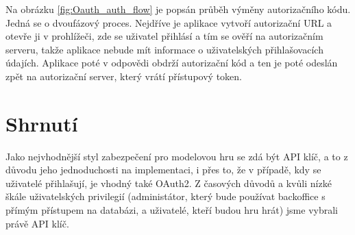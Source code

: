 Na obrázku \ref{fig:Oauth_auth_flow} je popsán průběh výměny autorizačního kódu.
Jedná se o dvoufázový proces.
Nejdříve je aplikace vytvoří autorizační URL a otevře ji v prohlížeči, zde se uživatel přihlásí a tím se ověří na autorizačním serveru, takže aplikace nebude mít informace o uživatelských přihlašovacích údajích. Aplikace poté v odpovědi obdrží autorizační kód a ten je poté odeslán zpět na autorizační server, který vrátí přístupový token.


\section{Shrnutí}
Jako nejvhodnější styl zabezpečení pro modelovou hru se zdá být API klíč, a to z důvodu jeho jednoduchosti na implementaci, i přes to, že v případě, kdy se uživatelé přihlašují, je vhodný také OAuth2. Z časových důvodů a kvůli nízké škále uživatelských privilegií (administátor, který bude používat backoffice s přímým přístupem na databázi, a uživatelé, kteří budou hru hrát) jsme vybrali právě API klíč.

